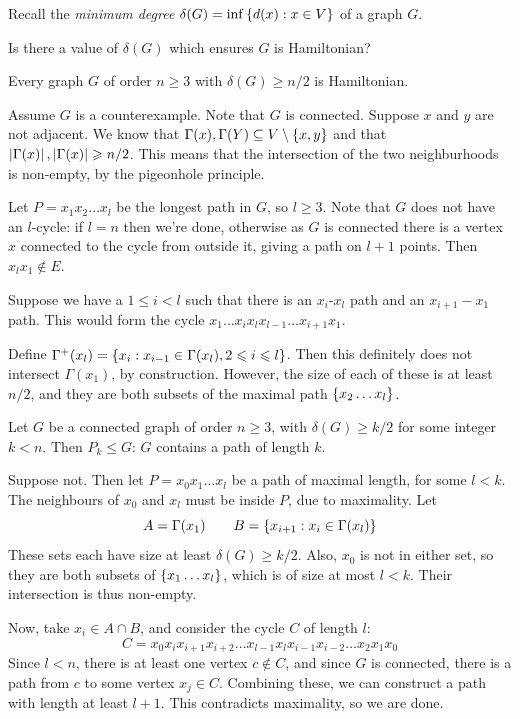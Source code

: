 \documentclass{article}
\begin{document}
Recall the \textit{minimum degree} $\delta(G) = \inf \left\lbrace d(x): x \in V \right\rbrace$ of a graph $G$.

Is there a value of $\delta(G)$ which ensures $G$ is Hamiltonian?

\begin{theorem}
    \label{diracs-theorem-on-hamiltonian-cycles}
    Every graph $G$ of order $n \geq 3$ with $\delta(G) \geq n/2$ is Hamiltonian.
\end{theorem}

\begin{prf}
    Assume $G$ is a counterexample. Note that $G$ is connected. Suppose $x$ and $y$ are not adjacent. We know that $\Gamma(x), \Gamma(Y) \subseteq V \setminus \left\lbrace x, y \right\rbrace$ and that $\left\lvert \Gamma(x) \right\rvert, \left\lvert \Gamma(x) \right\rvert \geqslant n/2$. This means that the intersection of the two neighburhoods is non-empty, by the pigeonhole principle.
    
    Let $P = x_1 x_2 \dots x_l$ be the longest path in $G$, so $l \geq 3$. Note that $G$ does not have an $l$-cycle: if $l = n$ then we're done, otherwise as $G$ is connected there is a vertex $x$ connected to the cycle from outside it, giving a path on $l+1$ points. Then $x_lx_1 \notin E$.
    
	Suppose we have a $1 \leq i < l$ such that there is an $x_i$-$x_l$ path and an $x_{i+1}-x_1$ path. This would form the cycle $x_1 \dots x_i x_l x_{l-1} \dots x_{i+1} x_1$.
	
	Define $\Gamma^+ (x_l) = \left\lbrace x_i: x_{i-1} \in \Gamma(x_l), 2 \leqslant i \leqslant l \right\rbrace$. Then this definitely does not intersect $\Gamma(x_1)$, by construction. However, the size of each of these is at least $n/2$, and they are both subsets of the maximal path $\left\lbrace x_2 \dots x_l \right\rbrace$.
\end{prf}

\begin{proposition}
    \label{must-contain-path-subgraph}
    Let $G$ be a connected graph of order $n \geq 3$, with $\delta(G) \geq k/2$ for some integer $k < n$. Then $P_k \leq G$: $G$ contains a path of length $k$.
\end{proposition}

\begin{prf}
    Suppose not. Then let $P = x_0 x_1 \dots x_l$ be a path of maximal length, for some $l < k$. The neighbours of $x_0$ and $x_l$ must be inside $P$, due to maximality. Let
    \[
	A = \Gamma(x_1) \qquad B = \left\lbrace x_{i+1} : x_i \in \Gamma(x_l) \right\rbrace
	\]
	These sets each have size at least $\delta(G) \geq k/2$. Also, $x_0$ is not in either set, so they are both subsets of $\left\lbrace x_1 \dots x_l \right\rbrace$, which is of size at most $l < k$. Their intersection is thus non-empty.
	
	Now, take $x_i \in A \cap B$, and consider the cycle $C$ of length $l$:
	\[
	C = x_0 x_i x_{i+1} x_{i+2} \dots x_{l-1} x_l x_{i-1} x_{i-2} \dots x_2 x_1 x_0 
	\]
	Since $l < n$, there is at least one vertex $c \notin C$, and since $G$ is connected, there is a path from $c$ to some vertex $x_j \in C$. Combining these, we can construct a path with length at least $l + 1$. This contradicts maximality, so we are done.
\end{prf}
\end{document}
